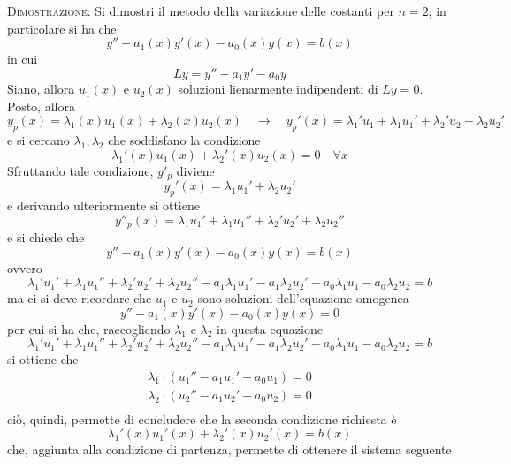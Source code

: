 \documentclass[a4paper]{extarticle}
\begin{document}
\vspace{2em}
\noindent
\normalfont \normalsize
\textsc{Dimostrazione}: Si dimostri il metodo della variazione delle costanti per $n=2$; in particolare si ha che
\[y'' - a_1(x) y'(x) - a_0(x) y(x) = b(x)\]
in cui
\[L y = y'' - a_1 y' - a_0 y\]
Siano, allora $u_1(x)$ e $u_2(x)$ soluzioni lienarmente indipendenti di $Ly = 0$. Posto, allora
\[y_p(x) = \lambda_1(x) u_1(x) + \lambda_2(x) u_2(x) \hspace{1em} \rightarrow \hspace{1em} y_p'(x)=\lambda_1' u_1 + \lambda_1 u_1' + \lambda_2' u_2 + \lambda_2 u_2'\]
e si cercano $\lambda_1, \lambda_2$ che soddisfano la condizione
\[\lambda_1'(x) u_1(x) + \lambda_2'(x) u_2(x) = 0 \hspace{1em} \forall x\]
Sfruttando tale condizione, $y'_p$ diviene
\[y_p'(x) = \lambda_1 u_1' + \lambda_2 u_2'\]
e derivando ulteriormente si ottiene
\[y''_p(x) = \lambda_1 u_1' + \lambda_1 u_1'' + \lambda_2' u_2' + \lambda_2 u_2''\]
e si chiede che
\[y'' - a_1(x) y'(x) - a_0(x) y(x) = b(x)\]
ovvero
\[\lambda_1'u_1'+\lambda_1 u_1'' + \lambda_2' u_2' + \lambda_2 u_2'' - a_1 \lambda_1 u_1' - a_1 \lambda_2 u_2' - a_0 \lambda_1 u_1 - a_0 \lambda_2 u_2 = b\]
ma ci si deve ricordare che $u_1$ e $u_2$ sono soluzioni dell'equazione omogenea
\[y'' - a_1(x) y'(x) - a_0(x) y(x) = 0\]
per cui si ha che, raccogliendo $\lambda_1$ e $\lambda_2$ in questa equazione 
\[\lambda_1'u_1'+\lambda_1 u_1'' + \lambda_2' u_2' + \lambda_2 u_2'' - a_1 \lambda_1 u_1' - a_1 \lambda_2 u_2' - a_0 \lambda_1 u_1 - a_0 \lambda_2 u_2 = b\]
si ottiene che
\begin{align*}
    \lambda_1 \cdot (u_1'' - a_1u_1'-a_0u_1) =0\\
    \lambda_2 \cdot (u_2'' - a_1u_2'-a_0u_2) =0\\
\end{align*}
ciò, quindi, permette di concludere che la seconda condizione richiesta è
\[\lambda_1'(x) u_1'(x) + \lambda_2'(x)u_2'(x)=b(x)\]
che, aggiunta alla condizione di partenza, permette di ottenere il sistema seguente
\end{document}
